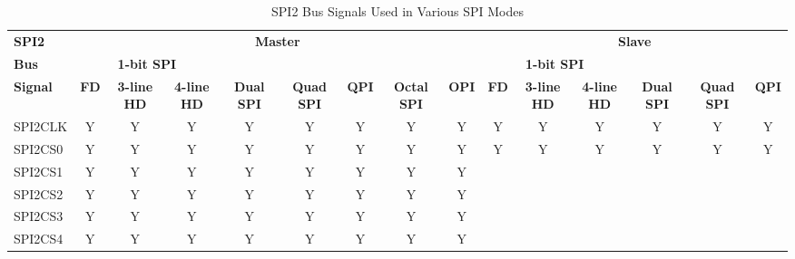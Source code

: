 \documentclass[main\_\_EN.tex]{subfiles}
\begin{document}
\begin{landscape}
\begin{table}[H]
    \centering
    \caption{SPI2 Bus Signals Used in Various SPI Modes}
    \label{tab:fspi-bus-singals-used-in-various-spi-modes}

    \begin{threeparttable}
    \begin{tabular}{ |p{2.0cm} |c|c|c|c|c|c|c|c|c|c|c|c|c|c| }
    \hline
        \rowcolor{lightgray}
        \textbf{SPI2}& \multicolumn{8}{c|}{\textbf{Master}} & \multicolumn{6}{c|}{\textbf{Slave}} \\\cline{2-15}
        \rowcolor{lightgray}
        \textbf{Bus}& \multicolumn{3}{c|}{\textbf{1-bit SPI}} & & & & & & \multicolumn{3}{c|}{\textbf{1-bit SPI}} & & & \\ \cline{2-4} \cline{10-12}
        \rowcolor{lightgray}
        \textbf{Signal} & \textbf{FD\tnote{1}} & \textbf{3-line HD\tnote{2}} & \textbf{4-line HD} & \multirow{-2}{*}{\textbf{Dual SPI}} & \multirow{-2}{*}{\textbf{Quad SPI}} & \multirow{-2}{*}{\textbf{QPI}} & \multirow{-2}{*}{\textbf{Octal SPI}} & \multirow{-2}{*}{\textbf{OPI}} & \textbf{FD} & \textbf{3-line HD} & \textbf{4-line HD} & \multirow{-2}{*}{\textbf{Dual SPI}} & \multirow{-2}{*}{\textbf{Quad SPI}} & \multirow{-2}{*}{\textbf{QPI}} \\ \hline
SPI2CLK                  & Y       & Y       & Y       & Y       & Y       & Y      & Y       & Y      & Y       & Y      & Y       & Y       & Y       & Y      \\ \hline
SPI2CS0                  & Y       & Y       & Y       & Y       & Y       & Y      & Y       & Y      & Y       & Y      & Y       & Y       & Y       & Y      \\ \hline
SPI2CS1                  & Y       & Y       & Y       & Y       & Y       & Y      & Y       & Y      &         &        &         &         &         &        \\ \hline
SPI2CS2                  & Y       & Y       & Y       & Y       & Y       & Y      & Y       & Y      &         &        &         &         &         &        \\ \hline
SPI2CS3                  & Y       & Y       & Y       & Y       & Y       & Y      & Y       & Y      &         &        &         &         &         &        \\ \hline
SPI2CS4                  & Y       & Y       & Y       & Y       & Y       & Y      & Y       & Y      &         &        &         &         &         &        \\ \hline

\end{tabular}
\end{threeparttable}
\end{table}
\end{landscape}
\end{document}
